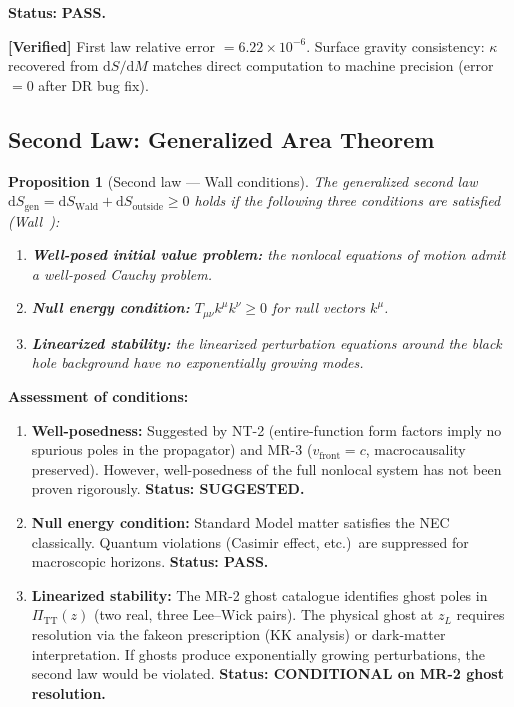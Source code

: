 \documentclass[11pt,a4paper]{article}
\renewcommand{\dd}{\mathrm{d}}
\theoremstyle{plain}
\newtheorem{proposition}[theorem]{Proposition}
\theoremstyle{definition}
\newcommand{\verified}[1]{%
  \par\smallskip\noindent
  \colorbox{green!10}{\parbox{\dimexpr\linewidth-2\fboxsep}{%
    \textcolor{green!50!black}{\textbf{[Verified]}} #1}}%
  \par\smallskip}
\begin{document}
\noindent\textbf{Status:} \textcolor{green!50!black}{\textbf{PASS.}}

\verified{First law relative error $= 6.22 \times 10^{-6}$.
Surface gravity consistency: $\kappa$ recovered from $\dd S/\dd M$
matches direct computation to machine precision (error $= 0$ after
DR bug fix).}

\subsection{Second Law: Generalized Area Theorem}

\begin{proposition}[Second law --- Wall conditions]\label{prop:second}
The generalized second law
$\dd S_{\mathrm{gen}} = \dd S_{\mathrm{Wald}} + \dd S_{\mathrm{outside}}
\geq 0$
holds if the following three conditions are satisfied
(Wall~\cite{Wall15}):
\begin{enumerate}[nosep]
  \item \textbf{Well-posed initial value problem:}
    the nonlocal equations of motion admit a well-posed Cauchy problem.
  \item \textbf{Null energy condition:}
    $T_{\mu\nu}k^\mu k^\nu \geq 0$ for null vectors $k^\mu$.
  \item \textbf{Linearized stability:}
    the linearized perturbation equations around the black hole
    background have no exponentially growing modes.
\end{enumerate}
\end{proposition}

\noindent\textbf{Assessment of conditions:}

\begin{enumerate}
  \item \textbf{Well-posedness:} Suggested by NT-2 (entire-function
    form factors imply no spurious poles in the propagator) and
    MR-3 ($v_{\mathrm{front}} = c$, macrocausality preserved).
    However, well-posedness of the full nonlocal system has not been
    proven rigorously.
    \textbf{Status: SUGGESTED.}

  \item \textbf{Null energy condition:} Standard Model matter
    satisfies the NEC classically.  Quantum violations (Casimir
    effect, etc.)\ are suppressed for macroscopic horizons.
    \textbf{Status: PASS.}

  \item \textbf{Linearized stability:} The MR-2 ghost catalogue
    identifies ghost poles in $\Pi_{\mathrm{TT}}(z)$ (two real, three
    Lee--Wick pairs).  The physical ghost at $z_L$ requires resolution
    via the fakeon prescription (KK analysis) or dark-matter
    interpretation.  If ghosts produce exponentially growing
    perturbations, the second law would be violated.
    \textbf{Status: CONDITIONAL on MR-2 ghost resolution.}
\end{enumerate}
\end{document}
